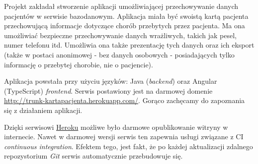 Projekt zakładał stworzenie aplikacji umożliwiającej przechowywanie danych pacjentów w serwisie bazodanowym. Aplikacja miała być swoistą kartą pacjenta przechowującą informacje dotyczące chorób przebytych przez pacjenta. Ma ona umożliwiać bezpieczne przechowywanie danych wrażliwych, takich jak pesel, numer telefonu itd. Umożliwia ona także prezentację tych danych oraz ich eksport (także w postaci anonimowej - bez danych osobowych - posiadających tylko informację o przebytej chorobie, nie o pacjencie). 

Aplikacja powstała przy użyciu języków: Java (\textit{backend}) oraz Angular (TypeScript) \textit{frontend}. Serwis postawiony jest na darmowej domenie \url{http://trunk-kartapacjenta.herokuapp.com/}. Gorąco zachęcamy do zapoznania się z działaniem aplikacji. 

Dzięki serwisowi \href{https://heroku.com/} {Heroku} możliwe było darmowe opublikowanie witryny w internecie. Nawet w darmowej wersji serwis ten zapewnia usługi związane z CI \textit{continuous integration}. Efektem tego, jest fakt, że po każdej aktualizacji zdalnego repozystorium \textit{Git} serwis automatycznie przebudowuje się.